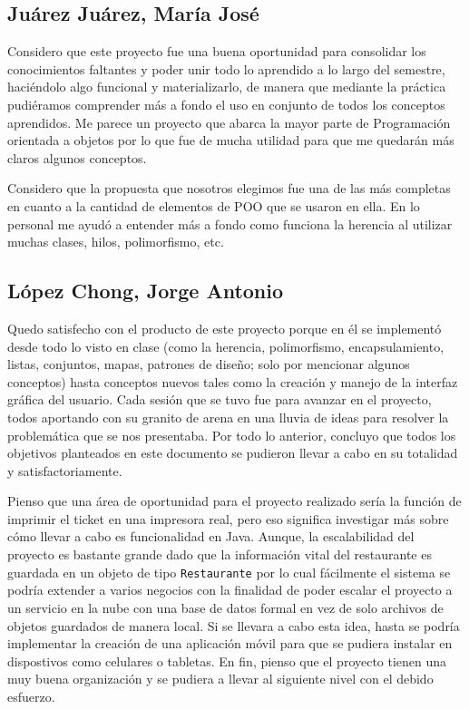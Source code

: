 \subsection*{Juárez Juárez, María José}
Considero que este proyecto fue una buena oportunidad para consolidar los conocimientos faltantes y 
poder unir todo lo aprendido a lo largo del semestre, haciéndolo algo funcional y materializarlo, de 
manera que mediante la práctica pudiéramos comprender más a fondo el uso en conjunto de todos los 
conceptos aprendidos. 
Me parece un proyecto que abarca la mayor parte de Programación orientada a 
objetos por lo que fue de mucha utilidad para que me quedarán más claros algunos conceptos. 


Considero que la propuesta que nosotros elegimos fue una de las más completas en cuanto 
a la cantidad de elementos de POO que se usaron en ella. 
En lo personal me ayudó a entender más a fondo como funciona la herencia al utilizar 
muchas clases, hilos, polimorfismo, etc.


\subsection*{López Chong, Jorge Antonio}
Quedo satisfecho con el producto de este proyecto porque en él se implementó desde todo lo visto en clase
(como la herencia, polimorfismo, encapsulamiento, listas, conjuntos, mapas, patrones de diseño; solo por
mencionar algunos conceptos) hasta conceptos nuevos tales como la creación y manejo de la interfaz
gráfica del usuario. Cada sesión que se tuvo fue para avanzar en el proyecto, todos aportando con su granito
de arena en una lluvia de ideas para resolver la problemática que se nos presentaba. Por todo lo anterior,
concluyo que todos los objetivos planteados en este documento se pudieron llevar a cabo en su totalidad y
satisfactoriamente.

Pienso que una área de oportunidad para el proyecto realizado sería la función de imprimir el ticket en una
impresora real, pero eso significa investigar más sobre cómo llevar a cabo es funcionalidad en Java. Aunque,
la escalabilidad del proyecto es bastante grande dado que la información vital del restaurante es guardada
en un objeto de tipo \texttt{Restaurante} por lo cual fácilmente el sistema se podría extender a varios
negocios con la finalidad de poder escalar el proyecto a un servicio en la nube con una base de datos formal
en vez de solo archivos de objetos guardados de manera local. Si se llevara a cabo esta idea, hasta se podría
implementar la creación de una aplicación móvil para que se pudiera instalar en dispostivos como celulares o
tabletas. En fin, pienso que el proyecto tienen una muy buena organización y se pudiera a llevar al siguiente
nivel con el debido esfuerzo.

